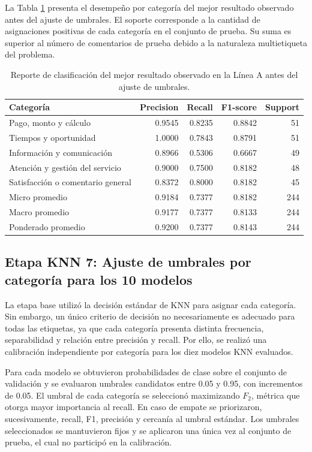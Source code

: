 \documentclass[12pt,a4paper]{article}
\begin{document}
La Tabla \ref{tab:reporte_mejor_modelo_a} presenta el desempeño por categoría del mejor resultado observado antes del ajuste de umbrales. El soporte corresponde a la cantidad de asignaciones positivas de cada categoría en el conjunto de prueba. Su suma es superior al número de comentarios de prueba debido a la naturaleza multietiqueta del problema.

\begin{table}[htbp]
\centering
\caption{Reporte de clasificación del mejor resultado observado en la Línea A antes del ajuste de umbrales.}
\label{tab:reporte_mejor_modelo_a}
\small
\begin{tabular}{lrrrr}
\toprule
\textbf{Categoría} & \textbf{Precision} & \textbf{Recall} & \textbf{F1-score} & \textbf{Support} \\
\midrule
Pago, monto y cálculo & 0.9545 & 0.8235 & 0.8842 & 51 \\
Tiempos y oportunidad & 1.0000 & 0.7843 & 0.8791 & 51 \\
Información y comunicación & 0.8966 & 0.5306 & 0.6667 & 49 \\
Atención y gestión del servicio & 0.9000 & 0.7500 & 0.8182 & 48 \\
Satisfacción o comentario general & 0.8372 & 0.8000 & 0.8182 & 45 \\
\midrule
Micro promedio & 0.9184 & 0.7377 & 0.8182 & 244 \\
Macro promedio & 0.9177 & 0.7377 & 0.8133 & 244 \\
Ponderado promedio & 0.9200 & 0.7377 & 0.8143 & 244 \\
\bottomrule
\end{tabular}
\end{table}
\FloatBarrier

\subsection{Etapa KNN 7: Ajuste de umbrales por categoría para los 10 modelos}

La etapa base utilizó la decisión estándar de KNN para asignar cada categoría. Sin embargo, un único criterio de decisión no necesariamente es adecuado para todas las etiquetas, ya que cada categoría presenta distinta frecuencia, separabilidad y relación entre precisión y recall. Por ello, se realizó una calibración independiente por categoría para los diez modelos KNN evaluados.

Para cada modelo se obtuvieron probabilidades de clase sobre el conjunto de validación y se evaluaron umbrales candidatos entre 0.05 y 0.95, con incrementos de 0.05. El umbral de cada categoría se seleccionó maximizando $F_2$, métrica que otorga mayor importancia al recall. En caso de empate se priorizaron, sucesivamente, recall, F1, precisión y cercanía al umbral estándar. Los umbrales seleccionados se mantuvieron fijos y se aplicaron una única vez al conjunto de prueba, el cual no participó en la calibración.
\end{document}
